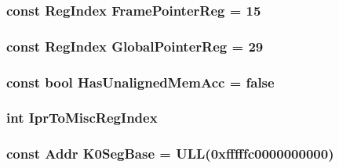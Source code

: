 \label{namespaceAlphaISA_a4ea7a0e850916ddcb5d2b77078e3e0c7}
\hypertarget{namespaceAlphaISA_a3bd8c9c7538a065181e1e54fea758ada}{
\subsubsection[{FramePointerReg}]{\setlength{\rightskip}{0pt plus 5cm}const {\bf RegIndex} {\bf FramePointerReg} = 15}}
\label{namespaceAlphaISA_a3bd8c9c7538a065181e1e54fea758ada}
\hypertarget{namespaceAlphaISA_a569ad17fb9f0eb70ebdb6f8b1c1ab5ce}{
\subsubsection[{GlobalPointerReg}]{\setlength{\rightskip}{0pt plus 5cm}const {\bf RegIndex} {\bf GlobalPointerReg} = 29}}
\label{namespaceAlphaISA_a569ad17fb9f0eb70ebdb6f8b1c1ab5ce}
\hypertarget{namespaceAlphaISA_a1c3adbc67ce574fe545e332d3bc677be}{
\subsubsection[{HasUnalignedMemAcc}]{\setlength{\rightskip}{0pt plus 5cm}const bool {\bf HasUnalignedMemAcc} = false}}
\label{namespaceAlphaISA_a1c3adbc67ce574fe545e332d3bc677be}
\hypertarget{namespaceAlphaISA_a8e41b21abec90c022e4c8c9f8b7a1e2e}{
\subsubsection[{IprToMiscRegIndex}]{\setlength{\rightskip}{0pt plus 5cm}int {\bf IprToMiscRegIndex}}}
\label{namespaceAlphaISA_a8e41b21abec90c022e4c8c9f8b7a1e2e}
\hypertarget{namespaceAlphaISA_addb273bca2a259dc76f478f53b61ff11}{
\subsubsection[{K0SegBase}]{\setlength{\rightskip}{0pt plus 5cm}const {\bf Addr} {\bf K0SegBase} = ULL(0xfffffc0000000000)}}
